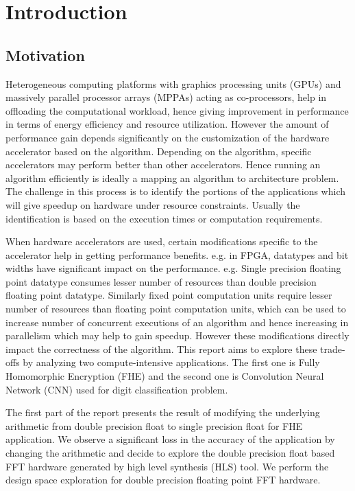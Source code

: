 \chapter{Introduction}
\label{ch1_introduction}
\section{Motivation}

Heterogeneous computing platforms with graphics processing units (GPUs) and massively parallel processor arrays (MPPAs) acting as co-processors, help in offloading the computational workload, hence giving improvement in performance in terms of energy efficiency and resource utilization. However the amount of performance gain depends significantly on the customization of the hardware accelerator based on the algorithm. Depending on the algorithm, specific accelerators may perform better than other accelerators. Hence running an algorithm efficiently is ideally a mapping an algorithm to architecture problem. The challenge in this process is to identify the portions of the applications which will give speedup on hardware under resource constraints. Usually the identification is based on the execution times or computation requirements. 

When hardware accelerators are used, certain modifications specific to the accelerator help in getting performance benefits. e.g. in FPGA, datatypes and bit widths have significant impact on the performance. e.g. Single precision floating point datatype consumes lesser number of resources than double precision floating point datatype. Similarly fixed point computation units require lesser number of resources than floating point computation units, which can be used to increase number of concurrent executions of an algorithm and hence increasing in parallelism which may help to gain speedup. However these modifications directly impact the correctness of the algorithm. This report aims to explore these trade-offs by analyzing two compute-intensive applications. The first one is Fully Homomorphic Encryption (FHE) and the second one is Convolution Neural Network (CNN) used for digit classification problem.

The first part of the report presents the result of modifying the underlying arithmetic from double precision float to single precision float for FHE application. We observe a significant loss in the accuracy of the application by changing the arithmetic and decide to explore the double precision float based FFT hardware generated by high level synthesis (HLS)
tool. We perform the design space exploration for double precision floating point FFT hardware.

